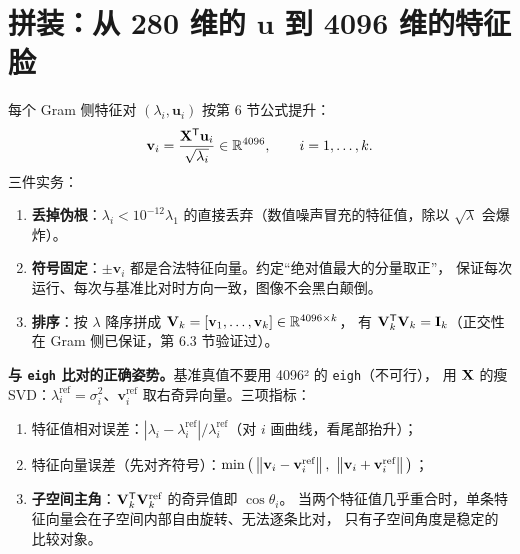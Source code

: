 \section{拼装：从 280 维的 $\mathbf{u}$ 到 4096 维的特征脸}

每个 Gram 侧特征对 $(\lambda_i,\mathbf{u}_i)$ 按第 6 节公式提升：
\[
\mathbf{v}_i=\frac{\mathbf{X}^{\mathsf{T}}\mathbf{u}_i}{\sqrt{\lambda_i}}\in\mathbb{R}^{4096},\qquad
i=1,\dots,k .
\]
三件实务：
\begin{enumerate}
  \item \textbf{丢掉伪根}：$\lambda_i<10^{-12}\lambda_1$ 的直接丢弃（数值噪声冒充的特征值，除以 $\sqrt\lambda$ 会爆炸）。
  \item \textbf{符号固定}：$\pm\mathbf{v}_i$ 都是合法特征向量。约定“绝对值最大的分量取正”，
  保证每次运行、每次与基准比对时方向一致，图像不会黑白颠倒。
  \item \textbf{排序}：按 $\lambda$ 降序拼成 $\mathbf{V}_k=[\mathbf{v}_1,\dots,\mathbf{v}_k]\in\mathbb{R}^{4096\times k}$，
  有 $\mathbf{V}_k^{\mathsf{T}}\mathbf{V}_k=\mathbf{I}_k$（正交性在 Gram 侧已保证，第 6.3 节验证过）。
\end{enumerate}

\textbf{与 \texttt{eigh} 比对的正确姿势。}基准真值不要用 4096² 的 \texttt{eigh}（不可行），
用 $\mathbf{X}$ 的瘦 SVD：$\lambda_i^{\text{ref}}=\sigma_i^2$、$\mathbf{v}_i^{\text{ref}}$ 取右奇异向量。三项指标：
\begin{enumerate}
  \item 特征值相对误差：$|\lambda_i-\lambda_i^{\text{ref}}|/\lambda_i^{\text{ref}}$（对 $i$ 画曲线，看尾部抬升）；
  \item 特征向量误差（先对齐符号）：$\min\big(\norm{\mathbf{v}_i-\mathbf{v}_i^{\text{ref}}},\ \norm{\mathbf{v}_i+\mathbf{v}_i^{\text{ref}}}\big)$；
  \item \textbf{子空间主角}：$\mathbf{V}_k^{\mathsf{T}}\mathbf{V}_k^{\text{ref}}$ 的奇异值即 $\cos\theta_i$。
  当两个特征值几乎重合时，单条特征向量会在子空间内部自由旋转、无法逐条比对，
  只有子空间角度是稳定的比较对象。
\end{enumerate}
